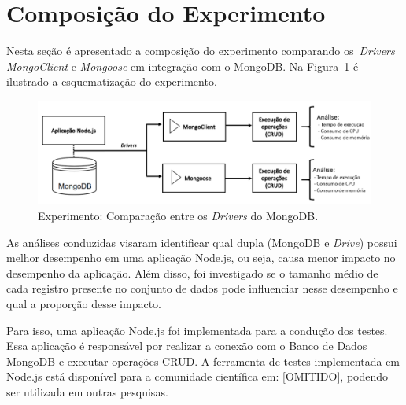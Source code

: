 \documentclass{svproc}
\begin{document}

\section{Composição do Experimento}
\label{section:experimento}

Nesta seção é apresentado a composição do experimento comparando os~\emph{Drivers} \emph{MongoClient} e \emph{Mongoose} em integração com o MongoDB. 
Na Figura~\ref{figure:diagrama-banco} é ilustrado a esquematização do experimento. 

\begin{figure}[!ht]
    \centering
    \includegraphics[width=\textwidth]{images/esquema-experimento.png}
    \caption{Experimento: Comparação entre os \emph{Drivers} do MongoDB.}
    \label{figure:diagrama-banco}
\end{figure}
 
As análises conduzidas visaram identificar qual dupla (MongoDB e \emph{Drive}) possui melhor desempenho em uma aplicação Node.js, ou seja, causa menor impacto no desempenho da aplicação. 
Além disso, foi investigado se o tamanho médio de cada registro presente no conjunto de dados pode influenciar nesse desempenho e qual a proporção desse impacto.

Para isso, uma aplicação Node.js foi implementada para a condução dos testes. Essa aplicação é responsável por realizar a conexão com o Banco de Dados MongoDB e executar operações CRUD. A ferramenta de testes implementada em Node.js está disponível para a comunidade científica em: [OMITIDO], podendo ser utilizada em outras pesquisas.%
\end{document}
